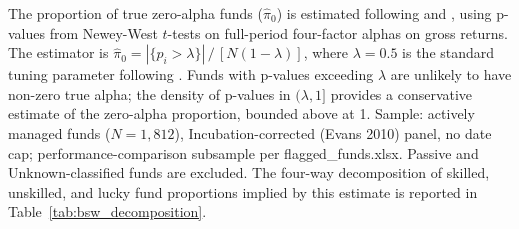 \begin{table}[!htbp]
\centering
{}
\setlength{\tabletempwidth}{\wd\tabletempbox}
\ifdim\tabletempwidth>\linewidth\setlength{\tabletempwidth}{\linewidth}\fi
\begin{minipage}{\tabletempwidth}
\captionsetup{width=\linewidth}
\caption{\label{tab:pi0_estimate}Aggregate Skill Estimate: Proportion of True Zero-Alpha Active Funds}
\ifdim\wd\tabletempbox>\linewidth
  \resizebox{\linewidth}{!}{\usebox{\tabletempbox}}
\else
  \usebox{\tabletempbox}
\fi
\par\medskip
\begin{singlespace}\footnotesize\noindent
The proportion of true zero-alpha funds ($\hat{\pi}_0$) is estimated following \textcite{Storey2002} and \textcite{BarrasScailletWermers2010}, using p-values from Newey-West $t$-tests on full-period \textcite{Carhart1997} four-factor alphas on gross returns. The estimator is $\hat{\pi}_0 = |\{p_i > \lambda\}| \,/\, [N(1-\lambda)]$, where $\lambda = 0.5$ is the standard tuning parameter following \textcite{Storey2002}. Funds with p-values exceeding $\lambda$ are unlikely to have non-zero true alpha; the density of p-values in $(\lambda, 1]$ provides a conservative estimate of the zero-alpha proportion, bounded above at 1. Sample: actively managed funds ($N = 1,812$), Incubation-corrected (Evans 2010) panel, no date cap; performance-comparison subsample per flagged\_funds.xlsx. Passive and Unknown-classified funds are excluded. The four-way decomposition of skilled, unskilled, and lucky fund proportions implied by this estimate is reported in Table~\ref{tab:bsw_decomposition}.
\end{singlespace}
\end{minipage}
\end{table}

